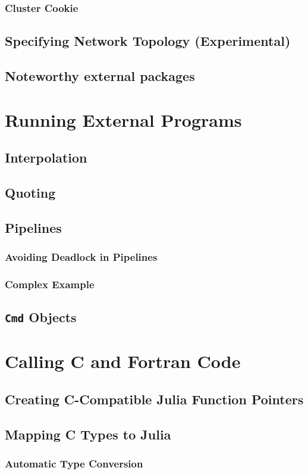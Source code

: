     \subsection{Cluster Cookie}
    \section{Specifying Network Topology (Experimental)}
    \section{Noteworthy external packages}
  \chapter{Running External Programs}
    \section{Interpolation}
    \section{Quoting}
    \section{Pipelines}
    \subsection{Avoiding Deadlock in Pipelines}
    \subsection{Complex Example}
    \section{\texttt{Cmd} Objects}
  \chapter{Calling C and Fortran Code}
    \section{Creating C-Compatible Julia Function Pointers}
    \section{Mapping C Types to Julia}
    \subsection{Automatic Type Conversion}
